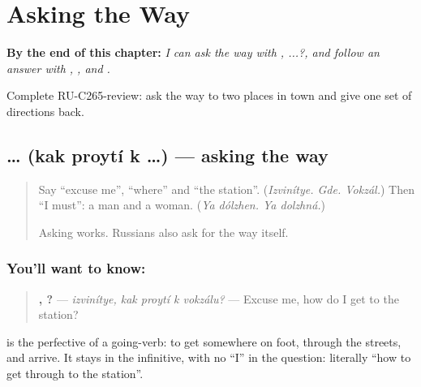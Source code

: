 
\chapter{Asking the Way}
\label{ch:ru-asking-the-way}

\begin{chapteropening}
\textbf{By the end of this chapter:} \emph{I can ask the way with ,    ...?, and follow an answer with , ,  and .}

Complete RU-C265-review: ask the way to two places in town and give one set of directions back.
\end{chapteropening}

\section[\texorpdfstring{\ru{как} \ru{пройти} \ru{к} …? (kak proytí k …?)}{как пройти к …? (kak proytí k …?)}]{   … (kak proytí k …) — asking the way}

\label{lesson:RU-C265-kak-proyti}



\begin{quote}
Say \textquotedblleft{}excuse me\textquotedblright{}, \textquotedblleft{}where\textquotedblright{} and \textquotedblleft{}the station\textquotedblright{}. (\emph{Izvinítye. Gde. Vokzál.}) Then \textquotedblleft{}I must\textquotedblright{}: a man and a woman. (\emph{Ya dólzhen. Ya dolzhná.})

Asking \emph{ } works. Russians also ask for the way itself.
\end{quote}

\subsection*{You'll want to know:  }
\begin{quote}
\textbf{,    ?} — \emph{izvinítye, kak proytí k vokzálu?} — Excuse me, how do I get to the station?
\end{quote}

\textbf{} is the perfective of a going-verb: to get somewhere on foot, through the streets, and arrive. It stays in the infinitive, with no \textquotedblleft{}I\textquotedblright{} in the question: literally \textquotedblleft{}how to get through to the station\textquotedblright{}.

